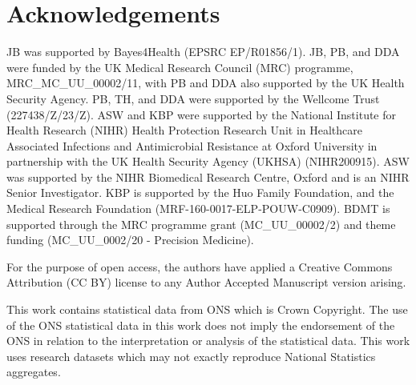\documentclass[referee,useAMS,usenatbib]{biom}
\begin{document}


\backmatter

\section*{Acknowledgements}
JB was supported by Bayes4Health (EPSRC EP/R01856/1).
JB, PB, and DDA were funded by the UK Medical Research Council (MRC) programme, MRC\_MC\_UU\_00002/11, with PB and DDA also supported by the UK Health Security Agency.
PB, TH, and DDA were supported by the Wellcome Trust (227438/Z/23/Z).
ASW and KBP were supported by the National Institute for Health Research (NIHR) Health Protection Research Unit in Healthcare Associated Infections and Antimicrobial Resistance at Oxford University in partnership with the UK Health Security Agency (UKHSA) (NIHR200915).
ASW was supported by the NIHR Biomedical Research Centre, Oxford and is an NIHR Senior Investigator.
KBP is supported by the Huo Family Foundation, and the Medical Research Foundation (MRF-160-0017-ELP-POUW-C0909).
BDMT is supported through the MRC programme grant (MC\_UU\_00002/2) and theme funding (MC\_UU\_0002/20 - Precision Medicine).

For the purpose of open access, the authors have applied a Creative Commons Attribution (CC BY) license to any Author Accepted Manuscript version arising.

This work contains statistical data from ONS which is Crown Copyright. The use of the ONS statistical data in this work does not imply the endorsement of the ONS in relation to the interpretation or analysis of the statistical data. This work uses research datasets which may not exactly reproduce National Statistics aggregates.
\end{document}

